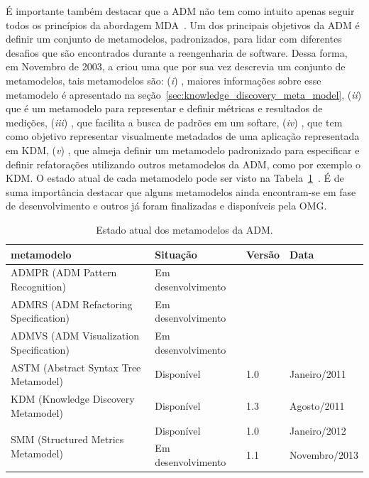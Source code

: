 É importante também destacar que a ADM não tem como intuito apenas seguir todos os princípios da abordagem MDA~\cite{ADM:OMG}. Um dos principais objetivos da ADM é definir um conjunto de metamodelos, padronizados, para lidar com diferentes desafios que são encontrados durante a reengenharia de software. Dessa forma, em Novembro de 2003, a  criou uma  que por sua vez descrevia um conjunto de metamodelos, tais metamodelos são: (\textit{i}) , maiores informações sobre esse metamodelo é apresentado na seção~\ref{sec:knowledge_discovery_meta_model}, (\textit{ii})  que é um metamodelo para representar e definir métricas e resultados de medições, (\textit{iii}) , que facilita a busca de padrões em um softare, (\textit{iv}) , que tem como objetivo representar visualmente metadados de uma aplicação representada em KDM, (\textit{v}) , que almeja definir um metamodelo padronizado para especificar e definir refatorações utilizando outros metamodelos da ADM, como por exemplo o KDM. O estado atual de cada metamodelo pode ser visto na Tabela~\ref{tab:todos_os_meta_modelos_da_ADM}~\cite{ADM:OMG}. É de suma importância destacar que alguns metamodelos ainda encontram-se em fase de desenvolvimento e outros já foram finalizadas e disponíveis pela OMG.

\begin{table}[]
\centering
\caption{Estado atual dos metamodelos da ADM.}
\label{tab:todos_os_meta_modelos_da_ADM}
\begin{tabular}{|l|l|l|l|}
\hline
metamodelo                                         & Situação           & Versão & Data          \\ \hline
ADMPR (ADM Pattern Recognition)                     & Em desenvolvimento &        &               \\ \hline
ADMRS (ADM Refactoring Specification)               & Em desenvolvimento &        &               \\ \hline
ADMVS (ADM Visualization Specification)             & Em desenvolvimento &        &               \\ \hline
ASTM (Abstract Syntax Tree Metamodel)               & Disponível         & 1.0    & Janeiro/2011  \\ \hline
KDM (Knowledge Discovery Metamodel)                 & Disponível         & 1.3    & Agosto/2011   \\ \hline
\multirow{2}{*}{SMM (Structured Metrics Metamodel)} & Disponível         & 1.0    & Janeiro/2012  \\ \cline{2-4} 
                                                    & Em desenvolvimento & 1.1    & Novembro/2013 \\ \hline
\end{tabular}
\end{table}

